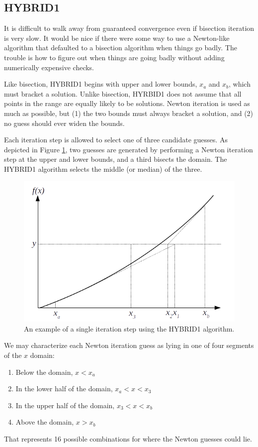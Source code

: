\documentclass{article}
\begin{document}
\subsection{HYBRID1}

It is difficult to walk away from guaranteed convergence even if bisection iteration is very slow.  It would be nice if there were some way to use a Newton-like algorithm that defaulted to a bisection algorithm when things go badly.  The trouble is how to figure out when things are going badly without adding numerically expensive checks.

Like bisection, HYBRID1 begins with upper and lower bounds, $x_a$ and $x_b$, which must bracket a solution.  Unlike bisection, HYRBID1 does not assume that all points in the range are equally likely to be solutions.  Newton iteration is used as much as possible, but (1) the two bounds must always bracket a solution, and (2) no guess should ever widen the bounds.

Each iteration step is allowed to select one of three candidate guesses.  As depicted in Figure \ref{fig:1d:hybrid}, two guesses are generated by performing a Newton iteration step at the upper and lower bounds, and a third bisects the domain.  The HYBRID1 algorithm selects the middle (or median) of the three.  

\begin{figure}
\centering
\includegraphics[width = 0.8\linewidth]{figures/1d_hybrid}
\caption{An example of a single iteration step using the HYBRID1 algorithm.}\label{fig:1d:hybrid}
\end{figure}

We may characterize each Newton iteration guess as lying in one of four segments of the $x$ domain:
\begin{enumerate}
\item Below the domain, $x < x_a$
\item In the lower half of the domain, $x_a < x < x_3$
\item In the upper half of the domain, $x_3 < x < x_b$
\item Above the domain, $x > x_b$
\end{enumerate}
That represents 16 possible combinations for where the Newton guesses could lie.
\end{document}
